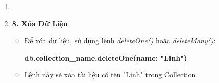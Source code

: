 \begin{enumerate}
\begin{itemize}[left = 0.5cm]
    \end{itemize}
    \item[] 
    \item []\hspace*{0.3cm}\textbf{8. Xóa Dữ Liệu
}
    \begin{itemize}[left = 0.5cm]
        \item []Để xóa dữ liệu, sử dụng lệnh \textit{deleteOne()} hoặc \textit{deleteMany()}:
         \begin{center}
            \textbf{db.collection\_name.deleteOne({name: "Linh"})}
        \end{center}
        \item []Lệnh này sẽ xóa tài liệu có tên "Linh" trong Collection.\cite{noauthor_how_nodate}
    \end{itemize}
\end{enumerate}

